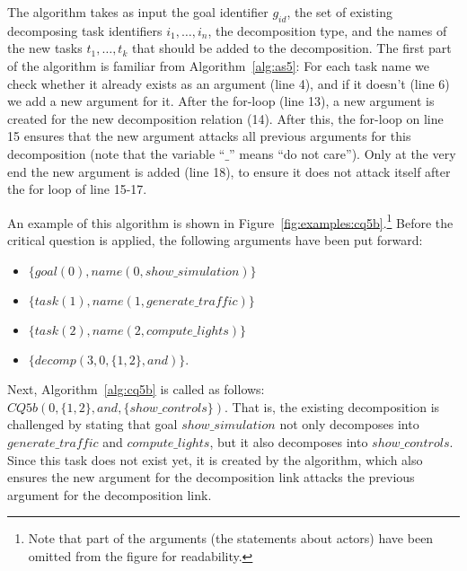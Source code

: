 The algorithm takes as input the goal identifier $g_{id}$, the set of existing decomposing task identifiers $i_1,\ldots,i_n$, the decomposition type, and the names of the new tasks $t_1,\ldots,t_k$ that should be added to the decomposition. The first part of the algorithm is familiar from Algorithm~\ref{alg:as5}: For each task name we check whether it already exists as an argument (line 4), and if it doesn't (line 6) we add a new argument for it. After the for-loop (line 13), a new argument is created for the new decomposition relation (14). After this, the for-loop on line 15 ensures that the new argument attacks all previous arguments for this decomposition (note that the variable ``$\_$'' means ``do not care''). Only at the very end the new argument is added (line 18), to ensure it does not attack itself after the for loop of line 15-17. 

An example of this algorithm is shown in Figure~\ref{fig:examples:cq5b}.\footnote{Note that part of the arguments (the statements about actors) have been omitted from the figure for readability.} Before the critical question is applied, the following arguments have been put forward:
\begin{itemize}
\item $\{goal(0),name(0,show\_simulation)\}$
\item $\{task(1),name(1,generate\_traffic)\}$
\item $\{task(2),name(2,compute\_lights)\}$
\item $\{decomp(3,0,\{1,2\},and)\}$.
\end{itemize}

Next, Algorithm~\ref{alg:cq5b} is called as follows: $CQ5b(0,\{1,2\},and,\{show\_controls\})$. That is, the existing decomposition is challenged by stating that goal $show\_simulation$ not only decomposes into $generate\_traffic$ and $compute\_lights$, but it also decomposes into $show\_controls$. Since this task does not exist yet, it is created by the algorithm, which also ensures the new argument for the decomposition link attacks the previous argument for the decomposition link.

